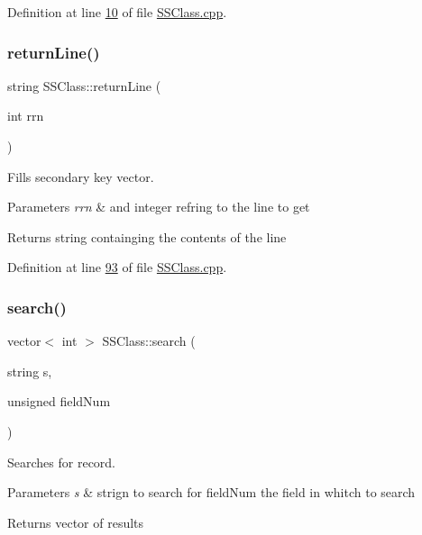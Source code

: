 Definition at line \hyperlink{SSClass_8cpp_source_l00010}{10} of file \hyperlink{SSClass_8cpp_source}{S\+S\+Class.\+cpp}.

\mbox{\label{classSSClass_ab0a8ea1af895df28359b5733bd920ef3}} 
\subsubsection{\texorpdfstring{return\+Line()}{returnLine()}}
{\footnotesize\ttfamily string S\+S\+Class\+::return\+Line (\begin{DoxyParamCaption}\item[{int}]{rrn }\end{DoxyParamCaption})}



Fills secondary key vector. 


\begin{DoxyParams}{Parameters}
{\em rrn} & and integer refring to the line to get \\
\hline
\end{DoxyParams}
\begin{DoxyReturn}{Returns}
string containging the contents of the line 
\end{DoxyReturn}


Definition at line \hyperlink{SSClass_8cpp_source_l00093}{93} of file \hyperlink{SSClass_8cpp_source}{S\+S\+Class.\+cpp}.

\mbox{\label{classSSClass_a9df3598c000a6a5e9ef994d19196e69f}} 
\subsubsection{\texorpdfstring{search()}{search()}}
{\footnotesize\ttfamily vector$<$ int $>$ S\+S\+Class\+::search (\begin{DoxyParamCaption}\item[{string}]{s,  }\item[{unsigned}]{field\+Num }\end{DoxyParamCaption})}



Searches for record. 


\begin{DoxyParams}{Parameters}
{\em s} & strign to search for  field\+Num the field in whitch to search \\
\hline
\end{DoxyParams}
\begin{DoxyReturn}{Returns}
vector of results 
\end{DoxyReturn}


